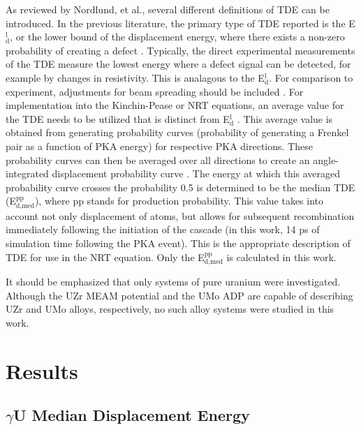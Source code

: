 \documentclass[review]{elsarticle}
\begin{document}
As reviewed by Nordlund, et al.\cite{nordlund2006}, several different definitions of TDE can be introduced. In the previous literature, the primary type of TDE reported is the E$^{\textrm{l}}_{\textrm{d}}$, or the lower bound of the displacement energy, where there exists a non-zero probability of creating a defect \cite{malerba2002}. Typically, the direct experimental measurements of the TDE measure the lowest energy where a defect signal can be detected, for example by changes in resistivity. This is analagous to the E$^{\textrm{l}}_{\textrm{d}}$. For comparison to experiment, adjustments for beam spreading should be included \cite{nordlund2006}. For implementation into the Kinchin-Pease or NRT equations, an average value for the TDE needs to be utilized that is distinct from E$^{\textrm{l}}_{\textrm{d}}$ \cite{nordlund2006,norgett1975}. This average value is obtained from generating probability curves (probability of generating a Frenkel pair as a function of PKA energy) for respective PKA directions. These probability curves can then be averaged over all directions to create an angle-integrated displacement probability curve \cite{nordlund2006}. The energy at which this averaged probability curve crosses the probability 0.5 is determined to be the median TDE (E$^{\textrm{pp}}_{\textrm{d,med}}$), where pp stands for production probability. This value takes into account not only displacement of atoms, but allows for subsequent recombination immediately following the initiation of the cascade (in this work, 14 ps of simulation time following the PKA event). This is the appropriate description of TDE for use in the NRT equation. Only the E$^{\textrm{pp}}_{\textrm{d,med}}$ is calculated in this work.

It should be emphasized that only systems of pure uranium were investigated. Although the UZr MEAM potential and the UMo ADP are capable of describing UZr and UMo alloys, respectively, no such alloy systems were studied in this work. 

\section{Results}
\subsection{$\gamma$U Median Displacement Energy}
\end{document}
